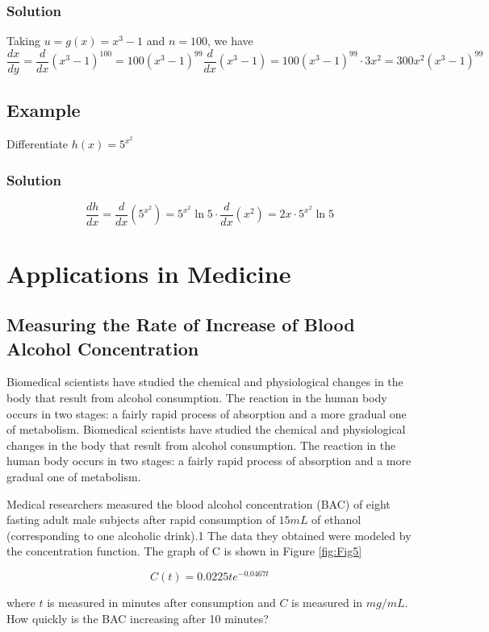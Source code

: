\subsubsection{Solution}
Taking $u=g(x)=x^3 - 1$ and $n=100$, we have
$$
    \frac{dx}{dy}=\frac{d}{dx}(x^3 - 1)^{100}=100(x^3 - 1)^{99}\frac{d}{dx}(x^3 - 1)=100(x^3-1)^{99} \cdot 3x^2=300 x^2(x^3-1)^{99}
$$

\subsection{Example}
Differentiate $h(x)=5^{x^2}$

\subsubsection{Solution}
$$
    \frac{dh}{dx}=\frac{d}{dx}(5^{x^2})=5^{x^2} \ln 5 \cdot \frac{d}{dx}(x^2)=2x \cdot 5^{x^2} \ln 5 
$$

\section{Applications in Medicine}

\subsection{Measuring the Rate of Increase of Blood Alcohol Concentration}

Biomedical scientists have studied the chemical and physiological changes in the body that result from alcohol consumption. The reaction in the human body occurs in two stages: a fairly rapid process of absorption and a more gradual one of metabolism. Biomedical scientists have studied the chemical and physiological changes in the body that result from alcohol consumption. The reaction in the human body occurs in two stages: a fairly rapid process of absorption and a more gradual one of metabolism.

Medical researchers measured the blood alcohol concentration (BAC) of eight fasting adult male subjects after rapid consumption of $15 mL$ of ethanol (corresponding to one alcoholic drink).1 The data they obtained were modeled by the concentration function. The graph of C is shown in Figure \ref{fig:Fig5}

\begin{equation}
\label{eq:4}
C(t) = 0.0225te^{-0.0467t}
\end{equation}

where $t$ is measured in minutes after consumption and $C$ is measured in $mg/mL$. How quickly is the BAC increasing after 10 minutes?

